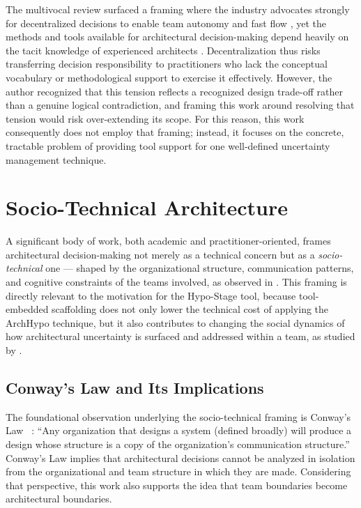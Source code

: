 The multivocal review surfaced a framing where the industry advocates strongly for decentralized
decisions to enable team autonomy and fast flow \citep{skelton2019}, yet the methods and tools available
for architectural decision-making depend heavily on the tacit knowledge of experienced
architects \citep{souza2019}. Decentralization thus risks transferring decision responsibility to
practitioners who lack the conceptual vocabulary or methodological support to exercise
it effectively. However, the author recognized that this tension reflects a recognized design trade-off 
rather than a genuine logical contradiction, and framing this work around resolving that tension would risk over-extending its scope.
For this reason, this work consequently does not employ that framing; instead, it focuses on the
concrete, tractable problem of providing tool support for one well-defined uncertainty
management technique.

\section{Socio-Technical Architecture}
\label{sec:sociotechnical}

A significant body of work, both academic and practitioner-oriented, frames
architectural decision-making not merely as a technical concern but as a
\emph{socio-technical} one --- shaped by the organizational structure,
communication patterns, and cognitive constraints of the teams
involved, as observed in \citet{tang2017human, razavian2019empirical, herbsleb1999splitting}.
This framing is directly relevant to the motivation for the Hypo-Stage tool,
because tool-embedded scaffolding does not only lower the technical cost of
applying the ArchHypo technique, but it also contributes to changing the social
dynamics of how architectural uncertainty is surfaced and addressed within a
team, as studied by \citet{borowa2023rationales, razavian2019empirical}.

\subsection{Conway's Law and Its Implications}
\label{subsec:conways-law}

The foundational observation underlying the socio-technical framing is Conway's
Law ~\citep{conway1968}: ``Any organization that designs a system (defined broadly) will
produce a design whose structure is a copy of the organization's communication
structure.'' Conway's Law implies that architectural decisions cannot be analyzed in
isolation from the organizational and team structure in which they are made. Considering that perspective, 
this work also supports the idea that team boundaries become architectural boundaries.


